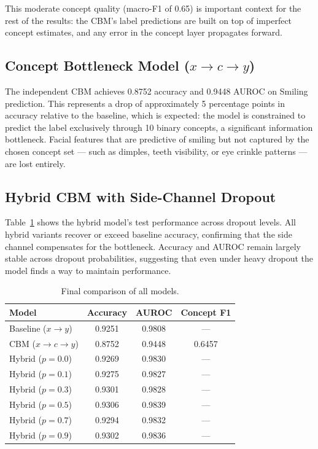 \documentclass[11pt,a4paper]{article}
\begin{document}
This moderate concept quality (macro-F1 of 0.65) is important context for the rest of the results: the CBM's label predictions are built on top of imperfect concept estimates, and any error in the concept layer propagates forward.


\subsection{Concept Bottleneck Model ($x \to c \to y$)}

The independent CBM achieves 0.8752 accuracy and 0.9448 AUROC on Smiling prediction. This represents a drop of approximately 5 percentage points in accuracy relative to the baseline, which is expected: the model is constrained to predict the label exclusively through 10 binary concepts, a significant information bottleneck. Facial features that are predictive of smiling but not captured by the chosen concept set --- such as dimples, teeth visibility, or eye crinkle patterns --- are lost entirely.


\subsection{Hybrid CBM with Side-Channel Dropout}

Table~\ref{tab:final} shows the hybrid model's test performance across dropout levels. All hybrid variants recover or exceed baseline accuracy, confirming that the side channel compensates for the bottleneck. Accuracy and AUROC remain largely stable across dropout probabilities, suggesting that even under heavy dropout the model finds a way to maintain performance.

\begin{table}[H]
\centering
\caption{Final comparison of all models.}
\label{tab:final}
\begin{tabular}{lccc}
\toprule
\textbf{Model} & \textbf{Accuracy} & \textbf{AUROC} & \textbf{Concept F1} \\
\midrule
Baseline ($x \to y$)          & 0.9251 & 0.9808 & ---    \\
CBM ($x \to c \to y$)         & 0.8752 & 0.9448 & 0.6457 \\
Hybrid ($p = 0.0$)            & 0.9269 & 0.9830 & ---    \\
Hybrid ($p = 0.1$)            & 0.9275 & 0.9827 & ---    \\
Hybrid ($p = 0.3$)            & 0.9301 & 0.9828 & ---    \\
Hybrid ($p = 0.5$)            & 0.9306 & 0.9839 & ---    \\
Hybrid ($p = 0.7$)            & 0.9294 & 0.9832 & ---    \\
Hybrid ($p = 0.9$)            & 0.9302 & 0.9836 & ---    \\
\bottomrule
\end{tabular}
\end{table}
\end{document}

